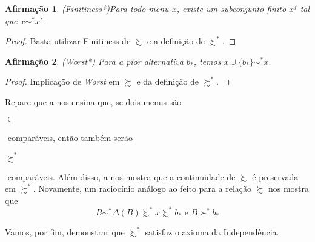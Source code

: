 \documentclass[11pt, a4paper]{article}
\theoremstyle{nonumberplain}
\newtheorem{proof}{Dem.}
\theoremstyle{plain}
\theoremstyle{plain}
\newtheorem{claim}{Afirmação}
\theoremstyle{plain}
\begin{document}

\begin{claim}(Finitiness*)Para todo menu $x$, existe um subconjunto finito $x^f$ tal que $x\sim^* x'$.\end{claim}
\begin{proof}
Basta utilizar Finitiness de $\succsim$ e a definição de $\succsim^*$. 
\end{proof}

\begin{claim} (Worst*) Para a pior alternativa $b_*$, temos $x\cup\{b_*\}\sim^* x$.\end{claim}
\begin{proof}
Implicação de \textit{Worst} em $\succsim$ e da definição de $\succsim^*$. 
\end{proof}



Repare que a  nos ensina que, se dois menus são \begin{small}$\subseteq$\end{small}-comparáveis, então também serão \begin{small}$\succsim^*$\end{small}-comparáveis. Além disso, a  nos mostra que a continuidade de $\succsim$ é preservada em $\succsim^*$. Novamente, um raciocínio análogo ao feito para a relação $\succsim$ nos mostra que \[B\sim^*\Delta(B)\succsim^* x\succsim^* b_* \text{ e } B\succ^* b_*\]

Vamos, por fim, demonstrar que $\succsim^*$ satisfaz o axioma da Independência. 
\end{document}
